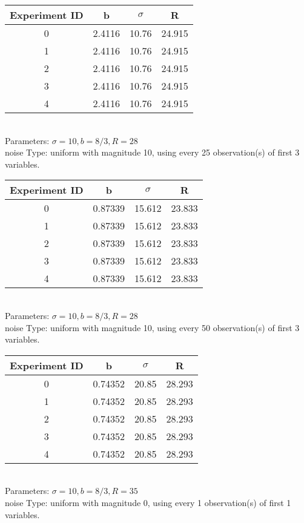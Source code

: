\begin{multicols}{3}
\begin{tabular}{cccc}
\hline Experiment ID & b & $\sigma$ & R \\ \hline 
0 & 2.4116 & 10.76 & 24.915\\ \hline 
 1 & 2.4116 & 10.76 & 24.915\\ \hline 
 2 & 2.4116 & 10.76 & 24.915\\ \hline 
 3 & 2.4116 & 10.76 & 24.915\\ \hline 
 4 & 2.4116 & 10.76 & 24.915\\ \hline 
 \end{tabular}\\
Parameters: $\sigma=10, b=8/3, R=28$\\
noise Type: uniform with magnitude 10, using every 25 observation(s) of first 3 variables.\\
\begin{tabular}{cccc}
\hline Experiment ID & b & $\sigma$ & R \\ \hline 
0 & 0.87339 & 15.612 & 23.833\\ \hline 
 1 & 0.87339 & 15.612 & 23.833\\ \hline 
 2 & 0.87339 & 15.612 & 23.833\\ \hline 
 3 & 0.87339 & 15.612 & 23.833\\ \hline 
 4 & 0.87339 & 15.612 & 23.833\\ \hline 
 \end{tabular}\\
Parameters: $\sigma=10, b=8/3, R=28$\\
noise Type: uniform with magnitude 10, using every 50 observation(s) of first 3 variables.\\
\begin{tabular}{cccc}
\hline Experiment ID & b & $\sigma$ & R \\ \hline 
0 & 0.74352 & 20.85 & 28.293\\ \hline 
 1 & 0.74352 & 20.85 & 28.293\\ \hline 
 2 & 0.74352 & 20.85 & 28.293\\ \hline 
 3 & 0.74352 & 20.85 & 28.293\\ \hline 
 4 & 0.74352 & 20.85 & 28.293\\ \hline 
 \end{tabular}\\
Parameters: $\sigma=10, b=8/3, R=35$\\
noise Type: uniform with magnitude 0, using every 1 observation(s) of first 1 variables.\\
\begin{tabular}{cccc}

\end{tabular}
\end{multicols}
